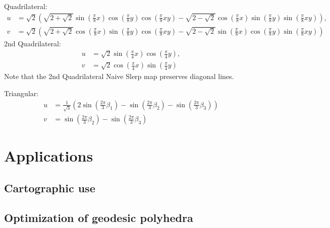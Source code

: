 \documentclass{amsart}[12pt]
\begin{document}
Quadrilateral:
\begin{equation}\begin{split}
u &= \sqrt 2 \left(\sqrt{2+\sqrt 2} \sin \left( \frac{\pi}{8} x \right)
\cos \left( \frac{\pi}{8} y \right) \cos \left( \frac{\pi}{8} xy \right)
- \sqrt{2-\sqrt 2} \cos \left( \frac{\pi}{8} x \right) \sin
\left( \frac{\pi}{8} y \right) \sin \left( \frac{\pi}{8} xy \right)\right), \\
v &= \sqrt 2 \left(\sqrt{2+\sqrt 2} \cos \left( \frac{\pi}{8} x \right)
\sin \left( \frac{\pi}{8} y \right) \cos \left( \frac{\pi}{8} xy \right)
- \sqrt{2-\sqrt 2} \sin \left( \frac{\pi}{8} x \right)
\cos \left( \frac{\pi}{8} y \right) \sin \left( \frac{\pi}{8} xy \right)\right)
\end{split}\end{equation}
2nd Quadrilateral:
\begin{equation}\begin{split}
u &= \sqrt 2
\sin \left(\frac{\pi}{4}x\right) \cos \left(\frac{\pi}{4}y\right),\\
v &= \sqrt 2 \cos \left(\frac{\pi}{4}x\right) \sin \left(\frac{\pi}{4}y\right)
\end{split}\end{equation}
Note that the 2nd Quadrilateral Naive Slerp map preserves diagonal lines.

Triangular:
\begin{equation}\begin{split}
u& =  \frac{1}{\sqrt{3}} \left(2 \sin\left(\frac{2\pi}{3} \beta_1 \right)
- \sin\left(\frac{2\pi}{3} \beta_2 \right)
- \sin\left(\frac{2\pi}{3} \beta_3 \right) \right)\\
v& = \sin\left(\frac{2\pi}{3} \beta_2 \right)
- \sin\left(\frac{2\pi}{3} \beta_3 \right)
\end{split}
\end{equation}

\section{Applications}
\subsection{Cartographic use}

\subsection{Optimization of geodesic polyhedra}



\end{document}
